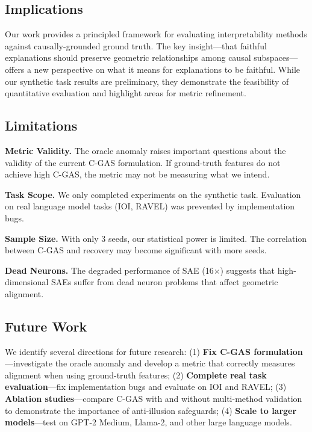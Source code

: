 \documentclass{article}
\begin{document}
\subsection{Implications}

Our work provides a principled framework for evaluating interpretability methods against causally-grounded ground truth. The key insight---that faithful explanations should preserve geometric relationships among causal subspaces---offers a new perspective on what it means for explanations to be faithful. While our synthetic task results are preliminary, they demonstrate the feasibility of quantitative evaluation and highlight areas for metric refinement.

\subsection{Limitations}

\textbf{Metric Validity.} The oracle anomaly raises important questions about the validity of the current C-GAS formulation. If ground-truth features do not achieve high C-GAS, the metric may not be measuring what we intend.

\textbf{Task Scope.} We only completed experiments on the synthetic task. Evaluation on real language model tasks (IOI, RAVEL) was prevented by implementation bugs.

\textbf{Sample Size.} With only 3 seeds, our statistical power is limited. The correlation between C-GAS and recovery may become significant with more seeds.

\textbf{Dead Neurons.} The degraded performance of SAE (16$\times$) suggests that high-dimensional SAEs suffer from dead neuron problems that affect geometric alignment.

\subsection{Future Work}

We identify several directions for future research: (1) \textbf{Fix C-GAS formulation}---investigate the oracle anomaly and develop a metric that correctly measures alignment when using ground-truth features; (2) \textbf{Complete real task evaluation}---fix implementation bugs and evaluate on IOI and RAVEL; (3) \textbf{Ablation studies}---compare C-GAS with and without multi-method validation to demonstrate the importance of anti-illusion safeguards; (4) \textbf{Scale to larger models}---test on GPT-2 Medium, Llama-2, and other large language models.
\end{document}
